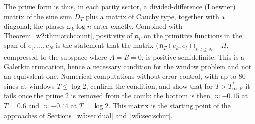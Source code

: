 \documentclass[11pt]{amsart}
\theoremstyle{definition}
\theoremstyle{remark}
\numberwithin{equation}{section}
\newcommand{\mT}{\mathfrak{m}_T}                       %
\newcommand{\aT}{\mathfrak{a}_T}                       %
\newcommand{\Tarch}{T^{*}_{\infty,\mathrm P}}          %
\begin{document}
The prime form is thus, in each parity sector, a divided-difference (Loewner) matrix of the sine sum $D_T$ plus a
matrix of Cauchy type, together with a diagonal; the phases $\omega_k\log n$ enter exactly. Combined with
Theorem~\ref{w2:thm:archcount}, positivity of $\aT$ on the primitive functions in the span of $e_1,\dots,e_N$ is the
statement that the matrix $\bigl(\mT(e_k,e_l)\bigr)_{k,l\le N}-\Pi$, compressed to the subspace where $A=B=0$, is
positive semidefinite. This is a Galerkin truncation, hence a necessary condition for the window problem and not an
equivalent one. Numerical computations without error control, with up to $80$ sines at windows $T\le\log2$, confirm
the condition, and show that for $T>\Tarch$ it fails once the prime $2$ is removed from the comb: the bottom is then
$\approx-0.15$ at $T=0.6$ and $\approx-0.44$ at $T=\log2$. This matrix is the starting point of the approaches of
Sections~\ref{w5:sec:dual} and~\ref{w5:sec:schur}.
\end{document}
